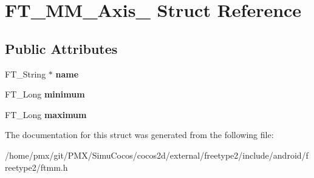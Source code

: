 \hypertarget{structFT__MM__Axis__}{}\section{F\+T\+\_\+\+M\+M\+\_\+\+Axis\+\_\+ Struct Reference}
\label{structFT__MM__Axis__}
\subsection*{Public Attributes}
\begin{DoxyCompactItemize}
\item 
\mbox{\label{structFT__MM__Axis___aca52d0e01d94459d0b7388f6e47a3772}} 
F\+T\+\_\+\+String $\ast$ {\bfseries name}
\item 
\mbox{\label{structFT__MM__Axis___a9dc31f02b350b1356e0896673b5b73a4}} 
F\+T\+\_\+\+Long {\bfseries minimum}
\item 
\mbox{\label{structFT__MM__Axis___addac1f8e71da1bedea9b393ae2751881}} 
F\+T\+\_\+\+Long {\bfseries maximum}
\end{DoxyCompactItemize}


The documentation for this struct was generated from the following file\+:\begin{DoxyCompactItemize}
\item 
/home/pmx/git/\+P\+M\+X/\+Simu\+Cocos/cocos2d/external/freetype2/include/android/freetype2/ftmm.\+h\end{DoxyCompactItemize}
